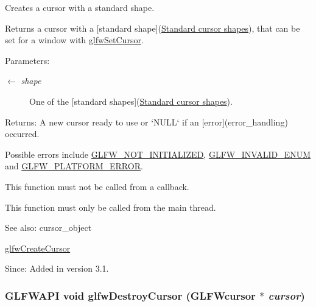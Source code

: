 Creates a cursor with a standard shape. 

Returns a cursor with a \mbox{[}standard shape\mbox{]}(\hyperlink{group__shapes}{Standard cursor shapes}), that can be set for a window with \hyperlink{group__input_gfaf103cea2f43530cff7de4e01126a4f}{glfwSetCursor}.

\begin{Desc}
\item[Parameters:]
\begin{description}
\item[\mbox{$\leftarrow$} {\em shape}]One of the \mbox{[}standard shapes\mbox{]}(\hyperlink{group__shapes}{Standard cursor shapes}). \end{description}
\end{Desc}
\begin{Desc}
\item[Returns:]A new cursor ready to use or `NULL` if an \mbox{[}error\mbox{]}(error\_\-handling) occurred.\end{Desc}
Possible errors include \hyperlink{group__errors_g2374ee02c177f12e1fa76ff3ed15e14a}{GLFW\_\-NOT\_\-INITIALIZED}, \hyperlink{group__errors_g76f6bb9c4eea73db675f096b404593ce}{GLFW\_\-INVALID\_\-ENUM} and \hyperlink{group__errors_gd44162d78100ea5e87cdd38426b8c7a1}{GLFW\_\-PLATFORM\_\-ERROR}.

This function must not be called from a callback.

This function must only be called from the main thread.

\begin{Desc}
\item[See also:]cursor\_\-object 

\hyperlink{group__input_gc0f0f691f2d110f9acfb4bfe07f1216c}{glfwCreateCursor}\end{Desc}
\begin{Desc}
\item[Since:]Added in version 3.1. \end{Desc}
\hypertarget{group__input_g27556b7122117bc1bbb4bb3cc003ea43}{
\subsubsection[glfwDestroyCursor]{\setlength{\rightskip}{0pt plus 5cm}GLFWAPI void glfwDestroyCursor ({\bf GLFWcursor} $\ast$ {\em cursor})}}
\label{group__input_g27556b7122117bc1bbb4bb3cc003ea43}


